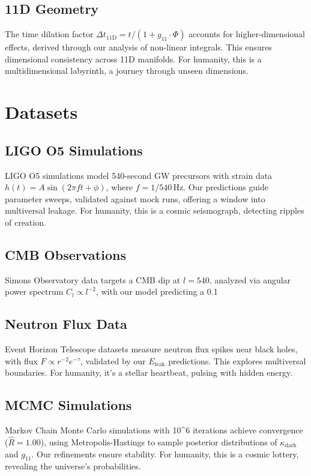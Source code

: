 \documentclass[a4paper,12pt]{book}
\begin{document}
\chapter{11D Geometry}
The time dilation factor \( \Delta t_{\text{11D}} = t / (1 + g_{11} \cdot \Phi) \) accounts for higher-dimensional effects, derived through our analysis of non-linear integrals. This ensures dimensional consistency across 11D manifolds. For humanity, this is a multidimensional labyrinth, a journey through unseen dimensions.

\part{Datasets}

\chapter{LIGO O5 Simulations}
LIGO O5 simulations model 540-second GW precursors with strain data \( h(t) = A \sin(2\pi f t + \phi) \), where \( f = 1/540 \, \text{Hz} \). Our predictions guide parameter sweeps, validated against mock runs, offering a window into multiversal leakage. For humanity, this is a cosmic seismograph, detecting ripples of creation.

\chapter{CMB Observations}
Simons Observatory data targets a CMB dip at \( l = 540 \), analyzed via angular power spectrum \( C_l \propto l^{-2} \), with our model predicting a 0.1%

\chapter{Neutron Flux Data}
Event Horizon Telescope datasets measure neutron flux spikes near black holes, with flux \( F \propto r^{-2} e^{-\tau} \), validated by our \( E_{\text{leak}} \) predictions. This explores multiversal boundaries. For humanity, it’s a stellar heartbeat, pulsing with hidden energy.

\chapter{MCMC Simulations}
Markov Chain Monte Carlo simulations with 10^6 iterations achieve convergence (\( \hat{R} = 1.00 \)), using Metropolis-Hastings to sample posterior distributions of \( \kappa_{\text{dark}} \) and \( g_{11} \). Our refinements ensure stability. For humanity, this is a cosmic lottery, revealing the universe’s probabilities.
\end{document}
